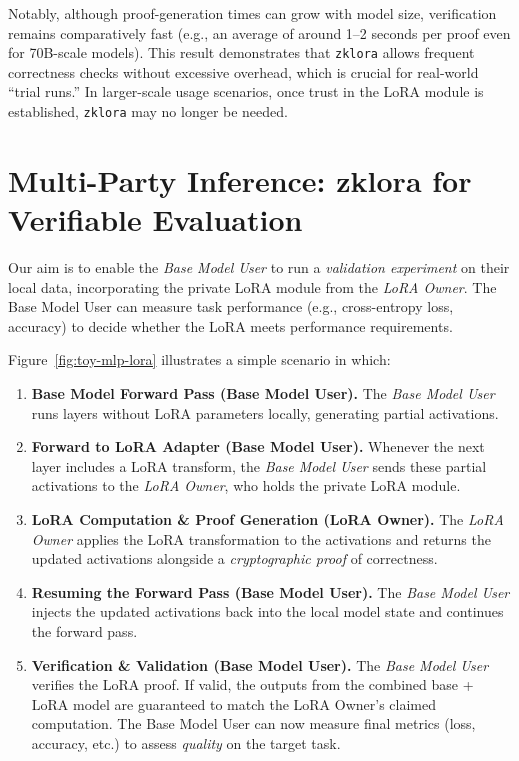 \documentclass[11pt]{article}
\begin{document}
Notably, although proof-generation times can grow with model size, verification remains comparatively fast (e.g., an average of around 1--2 seconds per proof even for 70B-scale models). This result demonstrates that \texttt{zklora} allows frequent correctness checks without excessive overhead, which is crucial for real-world “trial runs.” In larger-scale usage scenarios, once trust in the LoRA module is established, \texttt{zklora} may no longer be needed.

\section{Multi-Party Inference: zklora for Verifiable Evaluation}

Our aim is to enable the \emph{Base Model User} to run a \emph{validation experiment} on their local data, incorporating the private LoRA module from the \emph{LoRA Owner}. The Base Model User can measure task performance (e.g., cross-entropy loss, accuracy) to decide whether the LoRA meets performance requirements. 

Figure~\ref{fig:toy-mlp-lora} illustrates a simple scenario in which:

\begin{enumerate}
    \item \textbf{Base Model Forward Pass (Base Model User).}
    The \emph{Base Model User} runs layers without LoRA parameters locally, generating partial activations.

    \item \textbf{Forward to LoRA Adapter (Base Model User).}
    Whenever the next layer includes a LoRA transform, the \emph{Base Model User} sends these partial activations to the \emph{LoRA Owner}, who holds the private LoRA module.

    \item \textbf{LoRA Computation \& Proof Generation (LoRA Owner).}
    The \emph{LoRA Owner} applies the LoRA transformation to the activations and returns the updated activations alongside a \emph{cryptographic proof} of correctness.

    \item \textbf{Resuming the Forward Pass (Base Model User).}
    The \emph{Base Model User} injects the updated activations back into the local model state and continues the forward pass. 

    \item \textbf{Verification \& Validation (Base Model User).}
    The \emph{Base Model User} verifies the LoRA proof. If valid, the outputs from the combined base + LoRA model are guaranteed to match the LoRA Owner’s claimed computation. The Base Model User can now measure final metrics (loss, accuracy, etc.) to assess \emph{quality} on the target task.
\end{enumerate}
\end{document}
